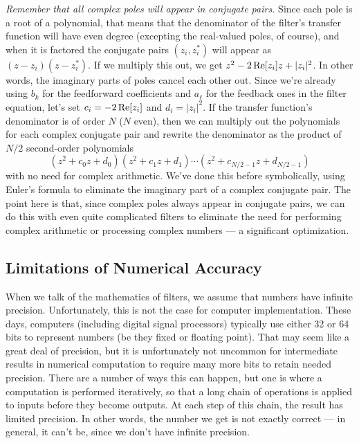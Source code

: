 \emph{Remember that all complex poles will appear in conjugate pairs.}
Since each pole is a root of a polynomial, that means that the
denominator of the filter's transfer function will have even degree
(excepting the real-valued poles, of course), and when it is factored
the conjugate pairs $(z_i,z_i^*)$ will appear as $(z-z_i)(z-z_i^*)$.
If we multiply this out, we get $z^2 - 2\operatorname{Re}[z_i] z +|z_i|^2$. In
other words, the imaginary parts of poles cancel each other out.
Since we're already using $b_k$ for the feedforward coefficients and
$a_\ell$ for the feedback ones in the filter equation, let's set $c_i
= -2\operatorname{Re}[z_i]$ and $d_i = |z_i|^2$.  If the transfer function's
denominator is of order $N$ ($N$ even), then we can multiply out the
polynomials for each complex conjugate pair and rewrite the
denominator as the product of $N/2$ second-order polynomials
\begin{equation}
(z^2+c_0z+d_0)(z^2+c_1z+d_1)\cdots (z^2+c_{N/2-1}z+d_{N/2-1})
\end{equation}
with no need for complex arithmetic.  We've done this before
symbolically, using Euler's formula to eliminate the imaginary part of
a complex conjugate pair. The point here is that, since complex poles
always appear in conjugate pairs, we can do this with even quite
complicated filters to eliminate the need for performing complex
arithmetic or processing complex numbers --- a significant
optimization.

\subsection{Limitations of Numerical Accuracy}

When we talk of the mathematics of filters, we assume that numbers
have infinite precision.  Unfortunately, this is not the case for
computer implementation.  These days, computers (including digital
signal processors) typically use either 32 or 64 bits to represent
numbers (be they fixed or floating point).  That may seem like a great
deal of precision, but it is unfortunately not uncommon for
intermediate results in numerical computation to require many more
bits to retain needed precision.  There are a number of ways this can
happen, but one is where a computation is performed iteratively, so
that a long chain of operations is applied to inputs before they
become outputs. At each step of this chain, the result has limited
precision. In other words, the number we get is not exactly correct
--- in general, it can't be, since we don't have infinite precision.

